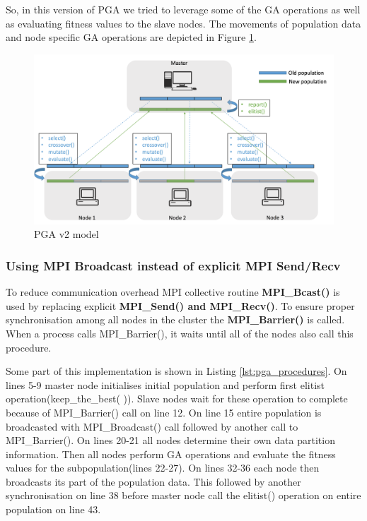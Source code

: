So, in this version of PGA we tried to leverage some of the GA operations as well as evaluating fitness values to the slave nodes. The movements of population data and node specific GA operations are depicted in Figure \ref{fig:pga_model_v2}.

\begin{figure}[!htb]
        \includegraphics[width= \linewidth]{figs/pga_model_v2.png}
    \caption{PGA v2 model}
     \label{fig:pga_model_v2}
\end{figure}

\subsubsection{Using MPI Broadcast instead of explicit MPI Send/Recv}
To reduce communication overhead MPI collective routine \textbf{MPI\_Bcast()} is used by replacing  explicit \textbf{MPI\_Send() and MPI\_Recv()}. To ensure proper synchronisation among all nodes in the cluster the \textbf{MPI\_Barrier()} is called. When a process calls MPI\_Barrier(), it waits until all of the nodes also call this procedure.

Some part of this implementation is shown in Listing \ref{lst:pga_procedures}. On lines 5-9 master node initialises initial population and perform first elitist operation(keep\_the\_best( )). Slave nodes wait for these operation to complete because of MPI\_Barrier() call on line 12. On line 15 entire population is broadcasted with MPI\_Broadcast() call followed by another call to MPI\_Barrier().  On lines 20-21 all nodes determine their own data partition information. Then all nodes perform GA operations and evaluate the fitness values for the subpopulation(lines 22-27). On lines 32-36 each node then broadcasts its part of the population data. This followed by another synchronisation on line 38 before master node call the elitist() operation on entire population on line 43.

